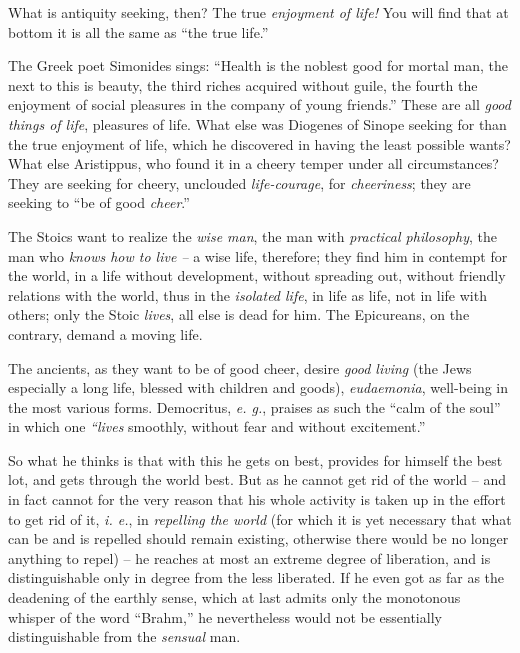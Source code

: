 \documentclass[12pt,a4paper]{book}
\begin{document}
What is antiquity seeking, then? The true \textit{enjoyment of life!} You will 
find that at bottom it is all the same as ``the true life.''

The Greek poet Simonides sings: ``Health is the noblest good for mortal man, 
the next to this is beauty, the third riches acquired without guile, the 
fourth the enjoyment of social pleasures in the company of young friends.'' 
These are all \textit{good things of life}, pleasures of life. What else was 
Diogenes of Sinope seeking for than the true enjoyment of life, which he 
discovered in having the least possible wants? What else Aristippus, who found 
it in a cheery temper under all circumstances? They are seeking for cheery, 
unclouded \textit{life-courage}, for \textit{cheeriness}; they are seeking to 
``be of good \textit{cheer}.''

The Stoics want to realize the \textit{wise man}, the man with 
\textit{practical philosophy}, the man who \textit{knows how to live --} a 
wise life, therefore; they find him in contempt for the world, in a life 
without development, without spreading out, without friendly relations with 
the world, thus in the \textit{isolated life}, in life as life, not in life 
with others; only the Stoic \textit{lives}, all else is dead for him. The 
Epicureans, on the contrary, demand a moving life.

The ancients, as they want to be of good cheer, desire \textit{good living} 
(the Jews especially a long life, blessed with children and goods), 
\textit{eudaemonia}, well-being in the most various forms. Democritus, 
\textit{e. g.}, praises as such the ``calm of the soul'' in which one 
\textit{``lives} smoothly, without fear and without excitement.''

So what he thinks is that with this he gets on best, provides for himself the 
best lot, and gets through the world best. But as he cannot get rid of the 
world -- and in fact cannot for the very reason that his whole activity is 
taken up in the effort to get rid of it, \textit{i. e.}, in \textit{repelling 
the world} (for which it is yet necessary that what can be and is repelled 
should remain existing, otherwise there would be no longer anything to repel) 
-- he reaches at most an extreme degree of liberation, and is distinguishable 
only in degree from the less liberated. If he even got as far as the deadening 
of the earthly sense, which at last admits only the monotonous whisper of the 
word ``Brahm,'' he nevertheless would not be essentially distinguishable 
from the \textit{sensual} man.
\end{document}
